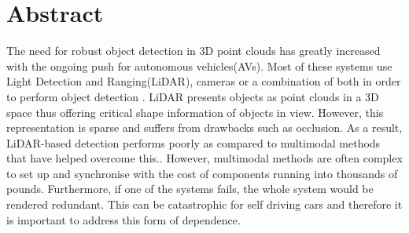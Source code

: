 %
%
%

\chapter*{Abstract}
\begin{SingleSpace}
\initial 
{T}he need for robust object detection in 3D point clouds has greatly increased with the ongoing push for autonomous vehicles(AVs). Most of these systems use Light Detection and Ranging(LiDAR), cameras or a combination of both in order to perform object detection \cite{ku2017joint}. LiDAR presents objects as point clouds in a 3D space thus offering critical shape information of objects in view. However, this representation is sparse and suffers from drawbacks such as occlusion. As a result, LiDAR-based detection performs poorly as compared to multimodal methods that have helped overcome this.\cite{zhou2017voxelnet}. However, multimodal methods are often complex to set up and synchronise \cite{ku2017joint} with the cost of components running into thousands of pounds. Furthermore, if one of the systems fails, the whole system would be rendered redundant. This can be catastrophic for self driving cars and therefore it is important to address this form of dependence.


\clearpage

\end{SingleSpace}

